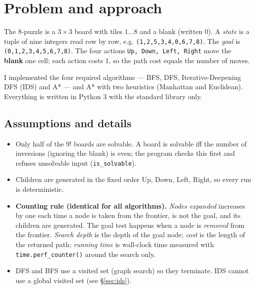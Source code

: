 \documentclass[11pt,a4paper]{article}
\begin{document}
\maketitle
\tableofcontents
\newpage

\section{Problem and approach}
The 8-puzzle is a $3\times3$ board with tiles $1\ldots8$ and a blank (written $0$). A \emph{state} is a tuple of nine integers read row by row, e.g. \texttt{(1,2,5,3,4,0,6,7,8)}. The \emph{goal} is \texttt{(0,1,2,3,4,5,6,7,8)}. The four actions \texttt{Up, Down, Left, Right} move the \textbf{blank} one cell; each action costs 1, so the path cost equals the number of moves.

I implemented the four required algorithms --- BFS, DFS, Iterative-Deepening DFS (IDS) and A* --- and A* with two heuristics (Manhattan and Euclidean). Everything is written in Python 3 with the standard library only.

\subsection{Assumptions and details}
\begin{itemize}[nosep]
\item Only half of the $9!$ boards are solvable. A board is solvable iff the number of inversions (ignoring the blank) is even; the program checks this first and refuses unsolvable input (\texttt{is\_solvable}).
\item Children are generated in the fixed order Up, Down, Left, Right, so every run is deterministic.
\item \textbf{Counting rule (identical for all algorithms).} \emph{Nodes expanded} increases by one each time a node is taken from the frontier, is not the goal, and its children are generated. The goal test happens when a node is \emph{removed} from the frontier. \emph{Search depth} is the depth of the goal node; \emph{cost} is the length of the returned path; \emph{running time} is wall-clock time measured with \texttt{time.perf\_counter()} around the search only.
\item DFS and BFS use a visited set (graph search) so they terminate. IDS cannot use a global visited set (see \S\ref{sec:ids}).
\end{itemize}
\end{document}
